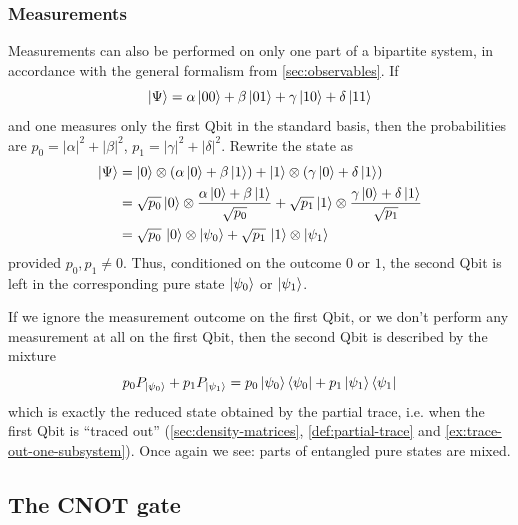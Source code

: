 
\subsubsection*{Measurements}

Measurements can also be performed on only one part of a bipartite system, in accordance with the general formalism from \autoref{sec:observables}.
If
\[
\ket{\Psi}
=
\alpha\ket{00}+\beta\ket{01}+\gamma\ket{10}+\delta\ket{11}
\]
and one measures only the first Qbit in the standard basis, then the probabilities are
\(
p_0 = |\alpha|^2+|\beta|^2
\), 
\(
p_1 = |\gamma|^2+|\delta|^2
\).
Rewrite the state as
\[
\begin{aligned}
\ket{\Psi}
&=
\ket{0}\otimes(\alpha\ket{0}+\beta\ket{1})
+
\ket{1}\otimes(\gamma\ket{0}+\delta\ket{1})
\\
&=
\sqrt{p_0}\ket{0}\otimes\frac{\alpha\ket{0}+\beta\ket{1}}{\sqrt{p_0}}
+
\sqrt{p_1}\ket{1}\otimes\frac{\gamma\ket{0}+\delta\ket{1}}{\sqrt{p_1}}
\\
&=
\sqrt{p_0}\,\ket{0}\otimes\ket{\psi_0}
+
\sqrt{p_1}\,\ket{1}\otimes\ket{\psi_1}
\end{aligned}
\]
provided \(p_0,p_1 \neq 0\).
Thus, conditioned on the outcome \(0\) or \(1\), the second Qbit is left in the corresponding pure state \(\ket{\psi_0}\) or \(\ket{\psi_1}\).

If we ignore the measurement outcome on the first Qbit, or we don't perform any measurement at all on the first Qbit, then the second Qbit is described by the mixture
\[
p_0 P_{\ket{\psi_0}} + p_1 P_{\ket{\psi_1}}
=
p_0 \ket{\psi_0}\bra{\psi_0}
+
p_1 \ket{\psi_1}\bra{\psi_1}
\]
which is exactly the reduced state obtained by the partial trace, i.e. when the first Qbit is ``traced out'' (\autoref{sec:density-matrices}, \autoref{def:partial-trace} and \autoref{ex:trace-out-one-subsystem}).
Once again we see: parts of entangled pure states are mixed.






\subsection{The CNOT gate}
\label{sec:cnot-gate}


